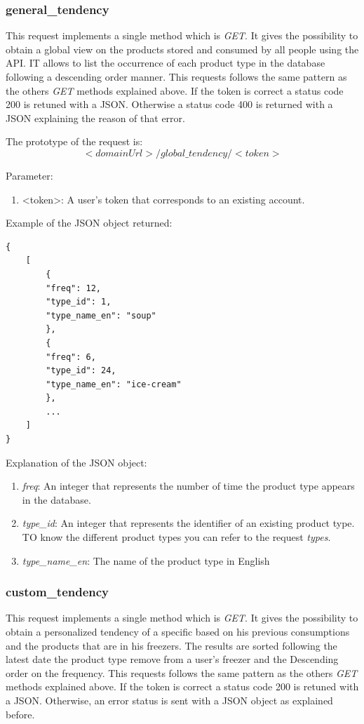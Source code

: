 \subsubsection{general\_tendency}
This request implements a single method which is \textit{GET}. It gives the possibility to obtain a global view on the products stored and consumed by all people using the API. IT allows to list the occurrence of each product type in the database following a descending order manner. This requests follows the same pattern as the others \textit{GET} methods explained above. If the token is correct a status code 200 is retuned with a JSON. Otherwise a status code 400 is returned with a JSON explaining the reason of that error.

The prototype of the request is:
$$<domainUrl>/global\_tendency/<token>$$

Parameter:
\begin{enumerate}
\item <token>: A user's token that corresponds to an existing account.
\end{enumerate}

Example of the JSON object returned:
\begin{lstlisting}
{
    [
        {
        "freq": 12,
        "type_id": 1,
        "type_name_en": "soup"
        },
        {
        "freq": 6,
        "type_id": 24,
        "type_name_en": "ice-cream"
        },
        ...
    ]
}
\end{lstlisting}

Explanation of the  JSON object:
\begin{enumerate}
\item \textit{freq}: An integer that represents the number of time the product type appears in the database.
\item \textit{type\_id}: An integer that represents the identifier of an existing product type. TO know the different product types you can refer to the request \textit{types}.
\item \textit{type\_name\_en}: The name of the product type in English
\end{enumerate}

\subsubsection{custom\_tendency}
This request implements a single method which is \textit{GET}. It gives the possibility to obtain a personalized tendency of a specific based on his previous consumptions and the products that are in his freezers. The results are sorted following the latest date the product type remove from a user's freezer and the Descending order on the frequency. This requests follows the same pattern as the others \textit{GET} methods explained above. If the token is correct a status code 200 is retuned with a JSON. Otherwise, an error status is sent with a JSON object as explained before.\\

